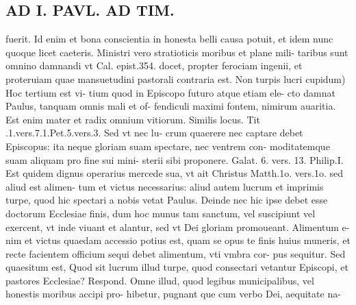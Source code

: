 \documentclass{article}
\begin{document}
\begin{pages}
\section*{AD I. PAVL. AD TIM. }
\marginpar{[ p.138. ]}\pstart fuerit. Id enim et bona conscientia in honesta belli causa potuit, et idem nunc quoque licet caeteris. Ministri vero stratioticis moribus et plane mili- taribus sunt omnino damnandi vt Cal. epist.354. docet, propter ferociam ingenii, et proteruiam quae mansuetudini pastorali contraria est.  \pend\pstart Non turpis lucri cupidum) Hoc tertium est vi- tium quod in Episcopo futuro atque etiam ele- cto damnat Paulus, tanquam omnis mali et of- fendiculi maximi fontem, nimirum auaritia. Est enim mater et radix omnium vitiorum. Similis locus. Tit .1.vers.7.1.Pet.5.vers.3. Sed vt nec lu- crum quaerere nec captare debet Episcopus: ita neque gloriam suam spectare, nec ventrem con- moditatemque suam aliquam pro fine sui mini- sterii sibi proponere. Galat. 6. vers. 13. Philip.I. Est quidem dignus operarius mercede sua, vt ait Christus Matth.1o. vers.1o. sed aliud est alimen- tum et victus necessarius: aliud autem lucrum et imprimis turpe, quod hic spectari a nobis vetat Paulus. Deinde nec hic ipse debet esse doctorum Ecclesiae finis, dum hoc munus tam sanctum, vel suscipiunt vel exercent, vt inde viuant et alantur, sed vt Dei gloriam promoueant. Alimentum e- nim et victus quaedam accessio potius est, quam se opus te finis huius muneris, et recte facientem officium sequi debet alimentum, vti vmbra cor- pus sequitur. Sed quaesitum est, Quod sit lucrum illud turpe, quod consectari vetantur Episcopi, et pastores Ecclesiae? Respond. Omne illud, quod legibus municipalibus, vel honestis moribus accipi pro- hibetur, pugnant que cum verbo Dei, aequitate na-  \pend

\end{pages}
\end{document}
